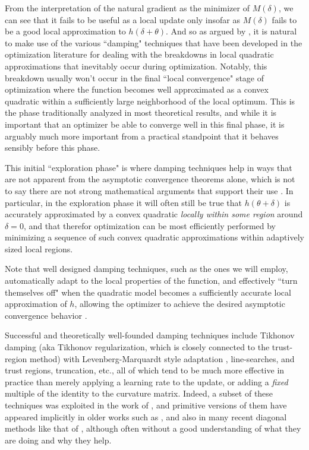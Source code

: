 \documentclass[12pt]{article}
\begin{document}
From the interpretation of the natural gradient as the minimizer of $M(\delta)$, we can see that it fails to be useful as a local update only insofar as $M(\delta)$ fails to be a good local approximation to $h(\delta + \theta)$.  And so as argued by \citet{ng_martens}, it is natural to make use of the various ``damping" techniques that have been developed in the optimization literature for dealing with the breakdowns in local quadratic approximations that inevitably occur during optimization.  Notably, this breakdown usually won't occur in the final ``local convergence" stage of optimization where the function becomes well approximated as a convex quadratic within a sufficiently large neighborhood of the local optimum.  This is the phase traditionally analyzed in most theoretical results, and while it is important that an optimizer be able to converge well in this final phase, it is arguably much more important from a practical standpoint that it behaves sensibly before this phase.  

This initial ``exploration phase" \citep{darken_2phase} is where damping techniques help in ways that are not apparent from the asymptotic convergence theorems alone, which is not to say there are not strong mathematical arguments that support their use \citep[see][]{nocedal_book}.  In particular, in the exploration phase it will often still be true that $h(\theta+\delta)$ is accurately approximated by a convex quadratic \emph{locally within some region} around $\delta = 0$, and that therefor optimization can be most efficiently performed by minimizing a sequence of such convex quadratic approximations within adaptively sized local regions.

Note that well designed damping techniques, such as the ones we will employ, automatically adapt to the local properties of the function, and effectively ``turn themselves off" when the quadratic model becomes a sufficiently accurate local approximation of $h$, allowing the optimizer to achieve the desired asymptotic convergence behavior \citep{levenberg_marquardt}.

Successful and theoretically well-founded damping techniques include Tikhonov damping (aka Tikhonov regularization, which is closely connected to the trust-region method) with Levenberg-Marquardt style adaptation \citep{levenberg_marquardt}, line-searches, and trust regions, truncation, etc., all of which tend to be much more effective in practice than merely applying a learning rate to the update, or adding a \emph{fixed} multiple of the identity to the curvature matrix.  Indeed, a subset of these techniques was exploited in the work of \citet{HF}, and primitive versions of them have appeared implicitly in older works such as \citet{diag_lecun}, and also in many recent diagonal methods like that of \citet{ADADELTA}, although often without a good understanding of what they are doing and why they help. 
\end{document}
